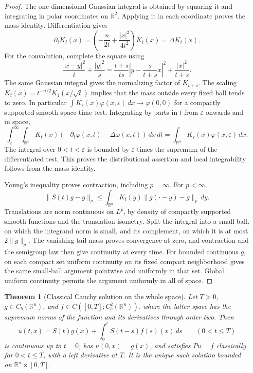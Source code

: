 \documentclass[11pt,oneside,openany]{book}
\theoremstyle{plain}
\newtheorem{theorem}{Theorem}[chapter]
\theoremstyle{definition}
\theoremstyle{remark}
\begin{document}
\begin{proof}
The one-dimensional Gaussian integral is obtained by squaring it and
integrating in polar coordinates on \(\mathbb R^2\).
Applying it in each coordinate proves the mass identity.
Differentiation gives
\[
 \partial_tK_t(x)
   =\left(-\frac{n}{2t}+\frac{|x|^2}{4t^2}\right)K_t(x)
   =\Delta K_t(x).
\]
For the convolution, complete the square using
\[
 \frac{|x-y|^2}{t}+\frac{|y|^2}{s}
 =\frac{t+s}{ts}\left|y-\frac{s}{t+s}x\right|^2
     +\frac{|x|^2}{t+s}.
\]
The same Gaussian integral gives the normalizing factor of \(K_{t+s}\).
The scaling \(K_t(x)=t^{-n/2}K_1(x/\sqrt t)\) implies that the mass
outside every fixed ball tends to zero. In particular
\(\int K_\varepsilon(x)\varphi(x,\varepsilon)\,dx
\to\varphi(0,0)\) for a compactly supported smooth space-time test.
Integrating by parts in \(t\) from \(\varepsilon\) onwards and in space,
\[
 \int_\varepsilon^\infty\int_{\mathbb R^n}
     K_t(x)(-\partial_t\varphi(x,t)-\Delta\varphi(x,t))\,dx\,dt
   =\int_{\mathbb R^n}K_\varepsilon(x)\varphi(x,\varepsilon)\,dx .
\]
The integral over \(0<t<\varepsilon\) is bounded by \(\varepsilon\)
times the supremum of the differentiated test. This proves the
distributional assertion and local integrability follows from the
mass identity.

Young's inequality proves contraction, including \(p=\infty\).
For \(p<\infty\),
\[
 \|S(t)g-g\|_p
  \leq \int_{\mathbb R^n}K_t(y)\|g(\cdot-y)-g\|_p\,dy .
\]
Translations are norm continuous on \(L^p\), by density of compactly
supported smooth functions and the translation isometry. Split the
integral into a small ball, on which the integrand norm is small, and
its complement, on which it is at most \(2\|g\|_p\). The vanishing
tail mass proves convergence at zero, and contraction and the
semigroup law then give continuity at every time. For bounded
continuous \(g\), on each compact set uniform continuity on its
fixed compact neighborhood gives the same small-ball argument
pointwise and uniformly in that set. Global uniform continuity
permits the argument uniformly in all of space.
\end{proof}

\begin{theorem}[Classical Cauchy solution on the whole space]
\label{pde:heat-cauchy}
Let \(T>0\), \(g\in C_b(\mathbb R^n)\), and
\(f\in C([0,T];C_b^2(\mathbb R^n))\), where the latter space has the
supremum norms of the function and its derivatives through order two.
Then
\[
 u(t,x)=S(t)g(x)+\int_0^t S(t-s)f(s)(x)\,ds
 \qquad (0<t\leq T)
\]
is continuous up to \(t=0\), has \(u(0,x)=g(x)\), and satisfies
\(Pu=f\) classically for \(0<t\leq T\), with a left derivative at \(T\).
It is the unique such solution bounded on \(\mathbb R^n\times[0,T]\).
\end{theorem}
\end{document}
